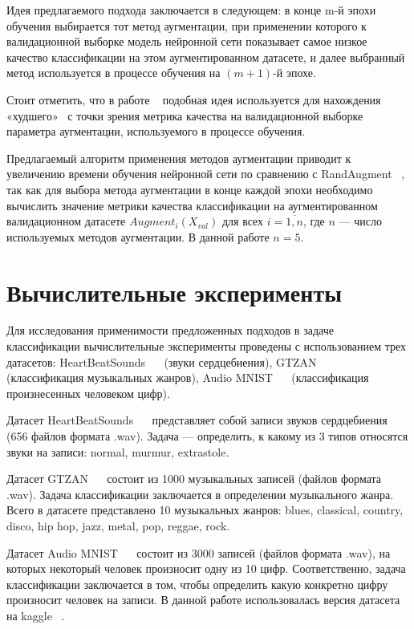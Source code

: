 \documentclass[12pt, fleqn]{article}
\begin{document}
Идея предлагаемого подхода заключается в следующем: в конце m-й эпохи обучения выбирается тот метод аугментации, при применении которого к валидационной выборке модель нейронной сети показывает самое низкое качество классификации на этом аугментированном датасете, и далее выбранный метод используется в процессе обучения на $(m + 1)$-й эпохе.

Стоит отметить, что в работе ~\cite{NearestAlgorithm} подобная идея используется для нахождения «худшего» \ с точки зрения метрика качества на валидационной выборке параметра аугментации, используемого в процессе обучения. 

Предлагаемый алгоритм применения методов аугментации приводит к увеличению времени обучения нейронной сети по сравнению с RandAugment ~\cite{RandAugment}, так как для выбора метода аугментации в конце каждой эпохи необходимо вычислить значение метрики качества классификации на аугментированном валидационном датасете $Augment_i(X_{val})$ для всех $i = \overline{1,n}$, где $n$ --- число используемых методов аугментации. В данной работе $n = 5$.

\newpage
\section{Вычислительные эксперименты}
	
Для исследования применимости предложенных подходов в задаче классификации вычислительные эксперименты проведены с использованием трех датасетов: HeartBeatSounds ~\cite{HeartbeatSoundsArticle}~\cite{HeartbeatSoundsKaggle} (звуки сердцебиения), GTZAN ~\cite{GTZAN_Article}~\cite{GTZAN_kaggle} (классификация музыкальных жанров), Audio MNIST ~\cite{AudioMnistArticle}~\cite{AudioMnistKaggle} (классификация произнесенных человеком цифр).
	
Датасет HeartBeatSounds ~\cite{HeartbeatSoundsArticle}~\cite{HeartbeatSoundsKaggle} представляет собой записи звуков сердцебиения (656 файлов формата .wav). Задача --- определить, к какому из 3 типов относятся звуки на записи: normal, murmur, extrastole.  
	
Датасет GTZAN ~\cite{GTZAN_Article}~\cite{GTZAN_kaggle} состоит из 1000 музыкальных записей (файлов формата .wav). Задача классификации заключается в определении музыкального жанра. Всего в датасете представлено 10 музыкальных жанров: blues, classical, country, disco, hip hop, jazz, metal, pop, reggae, rock.

Датасет Audio MNIST ~\cite{AudioMnistArticle}~\cite{AudioMnistKaggle} состоит из 3000 записей (файлов формата .wav), на которых некоторый человек произносит одну из 10 цифр. Соответственно, задача классификации заключается в том, чтобы определить какую конкретно цифру произносит человек на записи. В данной работе использовалась версия датасета на kaggle ~\cite{AudioMnistKaggle}.
\end{document}
